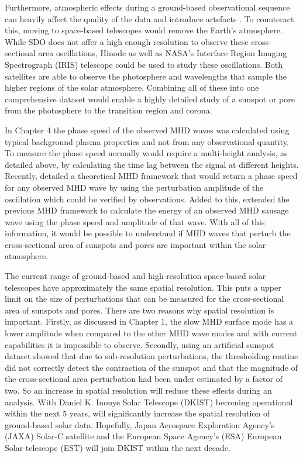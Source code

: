     Furthermore, atmospheric effects during a ground-based observational sequence can heavily affect the quality of the data and introduce artefacts \citep{2015A&A...579A..73M}.
    To counteract this, moving to space-based telescopes would remove the Earth's atmosphere.
    While SDO does not offer a high enough resolution to observe these cross-sectional area oscillations, Hinode as well as NASA's Interface Region Imaging Spectrograph (IRIS) telescope could be used to study these oscillations.
    Both satellites are able to observe the photosphere and wavelengths that sample the higher regions of the solar atmosphere. 
    Combining all of these into one comprehensive dataset would enable a highly detailed study of a sunspot or pore from the photosphere to the transition region and corona.  
    
    In Chapter 4 the phase speed of the observed MHD waves was calculated using typical background plasma properties and not from any observational quantity.
    To measure the phase speed normally would require a multi-height analysis, as detailed above, by calculating the time lag between the signal at different heights.
    Recently, \cite{2015A&A...579A..73M} detailed a theoretical MHD framework that would return a phase speed for any observed MHD wave by using the perturbation amplitude of the oscillation which could be verified by observations. 
    Added to this, \cite{2015A&A...578A..60M} extended the previous MHD framework to calculate the energy of an observed MHD sausage wave using the phase speed and amplitude of that wave.
	With all of this information, it would be possible to understand if MHD waves that perturb the cross-sectional area of sunspots and pores are important within the solar atmosphere.
	
    The current range of ground-based and high-resolution space-based solar telescopes have approximately the same spatial resolution.
    This puts a upper limit on the size of perturbations that can be measured for the cross-sectional area of sunspots and pores.
    There are two reasons why spatial resolution is important.
    Firstly, as discussed in Chapter 1, the slow MHD surface mode has a lower amplitude when compared to the other MHD wave modes and with current capabilities it is impossible to observe.
    Secondly, \cite{2015A&A...579A..73M} using an artificial sunspot dataset showed that due to sub-resolution perturbations, the thresholding routine did not correctly detect the contraction of the sunspot and that the magnitude of the cross-sectional area perturbation had been under estimated by a factor of two.
    So an increase in spatial resolution will reduce these effects during an analysis.
	With Daniel K. Inouye Solar Telescope (DKIST) becoming operational within the next 5 years, will significantly increase the spatial resolution of ground-based solar data.
	Hopefully, Japan Aerospace Exploration Agency's (JAXA) Solar-C satellite and the European Space Agency's (ESA) European Solar telescope (EST) will join DKIST within the next decade.
	
